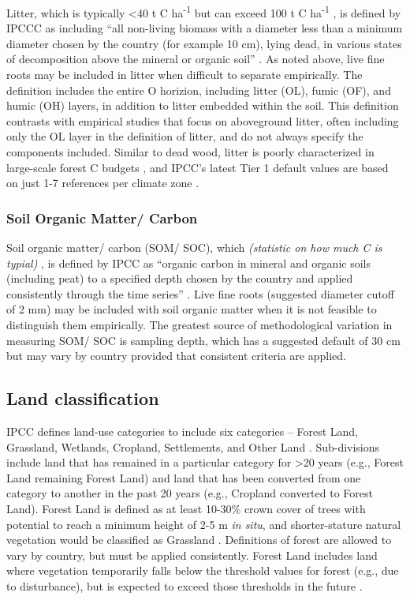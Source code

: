 \documentclass[, manuscript]{copernicus}
\begin{document}
Litter, which is typically \textless40 t C ha\textsuperscript{-1} but
can exceed 100 t C ha\textsuperscript{-1}
\citep{anderson-teixeira_carbon_2021}, is defined by IPCCC as including
``all non-living biomass with a diameter less than a minimum diameter
chosen by the country (for example 10 cm), lying dead, in various states
of decomposition above the mineral or organic soil''
\citep{ipcc_good_2003, ipcc_2006_2006}. As noted above, live fine roots
may be included in litter when difficult to separate empirically. The
definition includes the entire O horizion, including litter (OL), fumic
(OF), and humic (OH) layers, in addition to litter embedded within the
soil. This definition contrasts with empirical studies that focus on
aboveground litter, often including only the OL layer in the definition
of litter, and do not always specify the components included. Similar to
dead wood, litter is poorly characterized in large-scale forest C
budgets \citep{pan_large_2011, harris_global_2021}, and IPCC's latest
Tier 1 default values are based on just 1-7 references per climate zone
\citep[Table 2.2 in][]{ipcc_2019_2019}.

\subsubsection{Soil Organic Matter/ Carbon}

Soil organic matter/ carbon (SOM/ SOC), which \emph{(statistic on how
much C is typial)} \citep{ref}, is defined by IPCC as ``organic carbon
in mineral and organic soils (including peat) to a specified depth
chosen by the country and applied consistently through the time series''
\citep{ipcc_good_2003, ipcc_2006_2006}. Live fine roots (suggested
diameter cutoff of 2 mm) may be included with soil organic matter when
it is not feasible to distinguish them empirically. The greatest source
of methodological variation in measuring SOM/ SOC is sampling depth,
which has a suggested default of 30 cm but may vary by country provided
that consistent criteria are applied.

\subsection{Land classification}

IPCC defines land-use categories to include six categories -- Forest
Land, Grassland, Wetlands, Cropland, Settlements, and Other Land
\citep{ipcc_2006_2006}. Sub-divisions include land that has remained in
a particular category for \textgreater20 years (e.g., Forest Land
remaining Forest Land) and land that has been converted from one
category to another in the past 20 years (e.g., Cropland converted to
Forest Land). Forest Land is defined as at least 10-30\% crown cover of
trees with potential to reach a minimum height of 2-5 m \emph{in situ},
and shorter-stature natural vegetation would be classified as Grassland
\citep{ipcc_good_2003}. Definitions of forest are allowed to vary by
country, but must be applied consistently. Forest Land includes land
where vegetation temporarily falls below the threshold values for forest
(e.g., due to disturbance), but is expected to exceed those thresholds
in the future \citep{ipcc_good_2003}.
\end{document}
